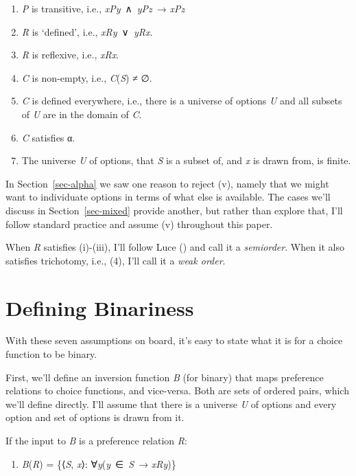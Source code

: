 \documentclass[
  11pt,
  letterpaper,
  DIV=11,
  numbers=noendperiod,
  twoside]{scrartcl}
\providecommand{\tightlist}{%
  \setlength{\itemsep}{0pt}\setlength{\parskip}{0pt}}
\begin{document}
\begin{enumerate}
\def\labelenumi{(\roman{enumi})}
\tightlist
\item
  \emph{P} is transitive, i.e., \emph{xPy}~∧~\emph{yPz}~→ \emph{xPz}
\item
  \emph{R} is `defined', i.e., \emph{xRy}~∨~\emph{yRx}.
\item
  \emph{R} is reflexive, i.e., \emph{xRx}.
\item
  \emph{C} is non-empty, i.e., \emph{C}(\emph{S}) ≠ ∅.
\item
  \emph{C} is defined everywhere, i.e., there is a universe of options
  \emph{U} and all subsets of \emph{U} are in the domain of \emph{C}.
\item
  \emph{C} satisfies α.
\item
  The universe \emph{U} of options, that \emph{S} is a subset of, and
  \emph{x} is drawn from, is finite.
\end{enumerate}

In Section~\ref{sec-alpha} we saw one reason to reject (v), namely that
we might want to individuate options in terms of what else is available.
The cases we'll discuss in Section~\ref{sec-mixed} provide another, but
rather than explore that, I'll follow standard practice and assume (v)
throughout this paper.

When \emph{R} satisfies (i)-(iii), I'll follow Luce
() and call it a \emph{semiorder}. When it
also satisfies trichotomy, i.e., (4), I'll call it a \emph{weak order}.

\section{Defining Binariness}\label{sec-defining}

With these seven assumptions on board, it's easy to state what it is for
a choice function to be binary.

First, we'll define an inversion function \emph{B} (for binary) that
maps preference relations to choice functions, and vice-versa. Both are
sets of ordered pairs, which we'll define directly. I'll assume that
there is a universe \emph{U} of options and every option and set of
options is drawn from it.

If the input to \emph{B} is a preference relation \emph{R}:

\begin{enumerate}
\def\labelenumi{(\arabic{enumi})}
\setcounter{enumi}{6}
\tightlist
\item
  \emph{B}(\emph{R}) = \{⟨\emph{S}, \emph{x}⟩:
  ∀\emph{y}(\emph{y}~∈~\emph{S}~→ \emph{xRy})\}
\end{enumerate}
\end{document}
